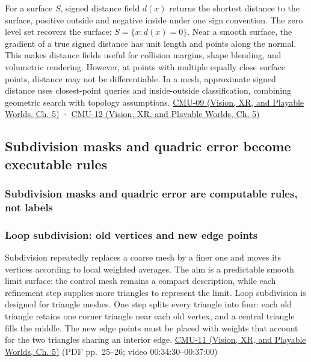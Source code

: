 For a surface \(S\), signed distance field \(d(x)\) returns the shortest distance to the surface, positive outside and negative inside under one sign convention. The zero level set recovers the surface: \(S=\{x:d(x)=0\}\). Near a smooth surface, the gradient of a true signed distance has unit length and points along the normal. This makes distance fields useful for collision margins, shape blending, and volumetric rendering. However, at points with multiple equally close surface points, distance may not be differentiable. In a mesh, approximate signed distance uses closest-point queries and inside-outside classification, combining geometric search with topology assumptions. \href{../07-Vision-XR-and-Playable-Worlds/main.pdf\#nameddest=04-visual-computing-ii-ch036-cmu-09---introduction-to-geometry}{CMU-09 (Vision, XR, and Playable Worlds, Ch. 5)} · \href{../07-Vision-XR-and-Playable-Worlds/main.pdf\#nameddest=04-visual-computing-ii-ch036-cmu-12---geometric-queries}{CMU-12 (Vision, XR, and Playable Worlds, Ch. 5)}

\subsection{Subdivision masks and quadric error become executable rules}\label{03-visual-computing-i-ch002-subdivision-masks-and-quadric-error-become-executable-rules}

\subsubsection{Subdivision masks and quadric error are computable rules, not labels}\label{03-visual-computing-i-ch002-subdivision-masks-and-quadric-error-are-computable-rules-not-labels}

\subsubsection{Loop subdivision: old vertices and new edge points}\label{03-visual-computing-i-ch002-loop-subdivision-old-vertices-and-new-edge-points}

Subdivision repeatedly replaces a coarse mesh by a finer one and moves its vertices according to local weighted averages. The aim is a predictable smooth limit surface: the control mesh remains a compact description, while each refinement step supplies more triangles to represent the limit. Loop subdivision is designed for triangle meshes. One step splits every triangle into four: each old triangle retains one corner triangle near each old vertex, and a central triangle fills the middle. The new edge points must be placed with weights that account for the two triangles sharing an interior edge. \href{../07-Vision-XR-and-Playable-Worlds/main.pdf\#nameddest=04-visual-computing-ii-ch036-cmu-11---digital-geometry-processing}{CMU-11 (Vision, XR, and Playable Worlds, Ch. 5)} (PDF pp.~25--26; video 00:34:30--00:37:00)

